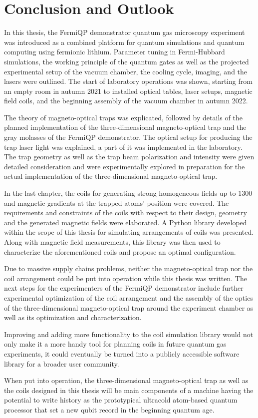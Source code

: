 \renewcommand{\imagepath}{../50-outro/img}

\chapter{Conclusion and Outlook}
In this thesis, the FermiQP demonstrator quantum gas microscopy experiment was introduced as a combined platform for quantum simulations and quantum computing using fermionic lithium. Parameter tuning in Fermi-Hubbard simulations, the working principle of the quantum gates as well as the projected experimental setup of the vacuum chamber, the cooling cycle, imaging, and the lasers were outlined. The start of laboratory operations was shown, starting from an empty room in autumn 2021 to installed optical tables, laser setups, magnetic field coils, and the beginning assembly of the vacuum chamber in autumn 2022.

The theory of magneto-optical traps was explicated, followed by details of the planned implementation of the three-dimensional magneto-optical trap and the gray molasses of the FermiQP demonstrator. The optical setup for producing the trap laser light was explained, a part of it was implemented in the laboratory. The trap geometry as well as the trap beam polarization and intensity were given detailed consideration and were experimentally explored in preparation for the actual implementation of the three-dimensional magneto-optical trap.

In the last chapter, the coils for generating strong homogeneous fields up to \SI[]{1300}{\gauss} and magnetic gradients at the trapped atoms' position were covered. The requirements and constraints of the coils with respect to their design, geometry and the generated magnetic fields were elaborated. A Python library developed within the scope of this thesis  for simulating arrangements of coils was presented. Along with magnetic field measurements, this library was then used to characterize the aforementioned coils and propose an optimal configuration.

Due to massive supply chains problems, neither the magneto-optical trap nor the coil arrangement could be put into operation while this thesis was written. The next steps for the experimenters of the FermiQP demonstrator include further experimental optimization of the coil arrangement and the assembly of the optics of the three-dimensional magneto-optical trap around the experiment chamber as well as its optimization and  characterization.

Improving and adding more functionality to the coil simulation library would not only make it a more handy tool for planning coils in future quantum gas experiments, it could eventually be turned into a publicly accessible software library for a broader user community.

When put into operation, the three-dimensional magneto-optical trap as well as the coils designed in this thesis will be main components of a machine having the potential to write history as the prototypical ultracold atom-based quantum processor that set a new qubit record in the beginning quantum age.